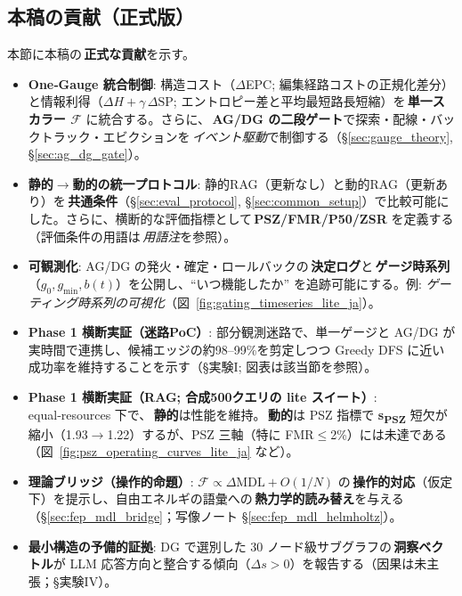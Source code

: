 \documentclass[ja=standard,xelatex]{bxjsarticle}
\newcommand{\F}{\mathcal{F}}
\begin{document}
\subsection{本稿の貢献（正式版）}\label{sec:contributions_formal}
本節に本稿の\,\textbf{正式な貢献}を示す。
\begin{itemize}[leftmargin=1.6em]
  \item \textbf{One‑Gauge 統合制御}: \;構造コスト（$\Delta$EPC; 編集経路コストの正規化差分）と情報利得（$\Delta H{+}\gamma\,\Delta\mathrm{SP}$; エントロピー差と平均最短路長短縮）を\,\textbf{単一スカラー $\F$} に統合する。さらに、\,\textbf{AG/DG の二段ゲート}で探索・配線・バックトラック・エビクションを\,\emph{イベント駆動}で制御する（§\ref{sec:gauge_theory}, §\ref{sec:ag_dg_gate}）。

  \item \textbf{静的$\to$動的の統一プロトコル}: \;静的RAG（更新なし）と動的RAG（更新あり）を\,\textbf{共通条件}（§\ref{sec:eval_protocol}, §\ref{sec:common_setup}）で比較可能にした。\;さらに、横断的な評価指標として\,\textbf{PSZ/FMR/P50/ZSR} を定義する（評価条件の用語は\,\emph{用語注}を参照）。

  \item \textbf{可観測化}: \;AG/DG の発火・確定・ロールバックの\,\textbf{決定ログ}と\,\textbf{ゲージ時系列}（$g_0, g_{\min}, b(t)$）を公開し、“いつ機能したか” を追跡可能にする。例: \emph{ゲーティング時系列の可視化}（図~\ref{fig:gating_timeseries_lite_ja}）。

  \item \textbf{Phase 1 横断実証（迷路PoC）}: \;部分観測迷路で、単一ゲージと AG/DG が実時間で連携し、候補エッジの約98--99\%を剪定しつつ Greedy DFS に近い成功率を維持することを示す（§実験I; 図表は該当節を参照）。

  \item \textbf{Phase 1 横断実証（RAG; 合成500クエリの lite スイート）}: \;equal‑resources 下で、\,\textbf{静的}は性能を維持。\,\textbf{動的}は PSZ 指標で \textbf{s\textsubscript{PSZ}} 短欠が縮小（1.93$\to$1.22）するが、PSZ 三軸（特に FMR$\le$2\%）には未達である（図~\ref{fig:psz_operating_curves_lite_ja} など）。

  \item \textbf{理論ブリッジ（操作的命題）}: \;$\F\propto\Delta\mathrm{MDL}{+}O(1/N)$ の\,\textbf{操作的対応}（仮定下）を提示し、自由エネルギの語彙への\,\textbf{熱力学的読み替え}を与える（§\ref{sec:fep_mdl_bridge}；写像ノート §\ref{sec:fep_mdl_helmholtz}）。

  \item \textbf{最小構造の予備的証拠}: \;DG で選別した 30 ノード級サブグラフの\,\textbf{洞察ベクトル}が LLM 応答方向と整合する傾向（$\Delta s{>}0$）を報告する（因果は未主張；§実験IV）。
\end{itemize}
\end{document}
